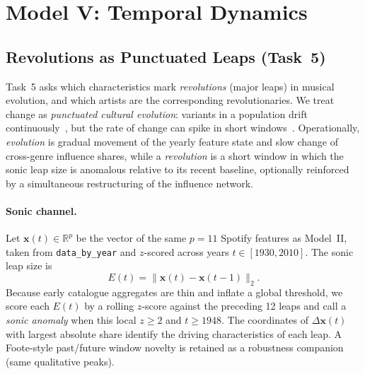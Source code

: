 \section{Model V: Temporal Dynamics}\label{sec:model-temporal}

\subsection{Revolutions as Punctuated Leaps (Task~5)}\label{subsec:t5-revolutions}

Task~5 asks which characteristics mark \emph{revolutions} (major leaps) in
musical evolution, and which artists are the corresponding revolutionaries.
We treat change as \emph{punctuated cultural evolution}: variants in a
population drift continuously~\cite{savage2019cultural}, but the rate of
change can spike in short windows~\cite{mauch2015evolution}. Operationally,
\emph{evolution} is gradual movement of the yearly feature state and slow
change of cross-genre influence shares, while a \emph{revolution} is a
short window in which the sonic leap size is anomalous relative to its
recent baseline, optionally reinforced by a simultaneous restructuring of
the influence network.

\paragraph{Sonic channel.}
Let \(\mathbf{x}(t)\in\mathbb{R}^{p}\) be the vector of the same \(p=11\)
Spotify features as Model~II, taken from \texttt{data\_by\_year} and
\(z\)-scored across years \(t\in[1930,2010]\). The sonic leap size is
\begin{equation}\label{eq:t5-E}
E(t)=\|\mathbf{x}(t)-\mathbf{x}(t-1)\|_2.
\end{equation}
Because early catalogue aggregates are thin and inflate a global threshold,
we score each \(E(t)\) by a rolling \(z\)-score against the preceding
12 leaps and call a \emph{sonic anomaly} when this local \(z\geq 2\) and
\(t\geq 1948\). The coordinates of \(\Delta\mathbf{x}(t)\) with largest
absolute share identify the driving characteristics of each leap. A Foote-style
past/future window novelty is retained as a robustness companion (same
qualitative peaks).

